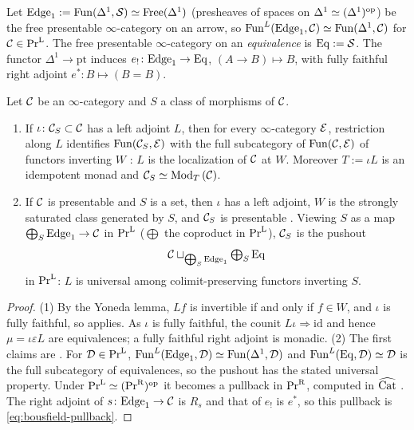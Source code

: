 %
Let
$\mathrm{Edge}_{1} := \operatorname{Fun}(\Delta^{1},\mathcal{S}) \simeq \operatorname{Free}(\Delta^{1})$
(presheaves of spaces on
$\Delta^{1} \simeq (\Delta^{1})^{\mathrm{op}}$)
be the free presentable $\infty$-category on an arrow, so
$\operatorname{Fun}^{L}(\mathrm{Edge}_{1},\mathcal{C}) \simeq \operatorname{Fun}(\Delta^{1},\mathcal{C})$
for $\mathcal{C} \in \operatorname{Pr}^{\operatorname{L}}$. The free presentable $\infty$-category on an
\emph{equivalence} is $\mathrm{Eq} := \mathcal{S}$.
The functor
$\Delta^{1} \to \mathrm{pt}$
induces
$e_{!}\colon \mathrm{Edge}_{1} \to \mathrm{Eq}$,
$(A \to B) \mapsto B$, with fully faithful right adjoint
$e^{*}\colon B \mapsto (B = B)$.

\begin{prop}
\label{prop:bousfield-pushout}
%
Let $\mathcal{C}$ be an $\infty$-category and $S$ a class of morphisms of $\mathcal{C}$.
\begin{enumerate}
\item If
$\iota\colon \mathcal{C}_{S} \subset \mathcal{C}$
has a left adjoint $L$, then for every $\infty$-category $\mathcal{E}$,
restriction along $L$ identifies $\operatorname{Fun}(\mathcal{C}_{S},\mathcal{E})$ with the full subcategory of
$\operatorname{Fun}(\mathcal{C},\mathcal{E})$ of functors inverting $W$ \cite[5.2.7.12]{htt}:
$L$ is the localization of $\mathcal{C}$ at $W$. Moreover $T := \iota L$ is an idempotent
monad and
$\mathcal{C}_{S} \simeq {\operatorname{Mod}_{T}\left(\mathcal{C}\right)}$.
\item If $\mathcal{C}$ is presentable and $S$ is a set, then $\iota$ has a left adjoint,
$W$ is the strongly saturated class generated by $S$,
and $\mathcal{C}_{S}$ is presentable \cite[5.5.4.15]{htt}. Viewing $S$ as a map
$\bigoplus_{S}\mathrm{Edge}_{1} \to \mathcal{C}$
in $\operatorname{Pr}^{\operatorname{L}}$ ($\bigoplus$ the coproduct in $\operatorname{Pr}^{\operatorname{L}}$), $\mathcal{C}_{S}$ is the pushout
\begin{equation*}
\mathcal{C} \sqcup_{\bigoplus_{S}\mathrm{Edge}_{1}} \textstyle\bigoplus_{S}\mathrm{Eq}
\end{equation*}
in $\operatorname{Pr}^{\operatorname{L}}$: $L$ is universal among colimit-preserving functors inverting $S$.
\end{enumerate}
\end{prop}

\begin{proof}
%
(1) By the Yoneda lemma, $Lf$ is invertible if and only if $f \in W$,
and $\iota$ is fully faithful, so \cite[5.2.7.12]{htt} applies.
As $\iota$ is fully faithful, the counit
$L\iota \Rightarrow \mathrm{id}$
and hence
$\mu = \iota\varepsilon L$
are equivalences; a fully faithful right adjoint is monadic.
(2) The first claims are \cite[5.5.4.15]{htt}. For $\mathcal{D} \in \operatorname{Pr}^{\operatorname{L}}$,
$\operatorname{Fun}^{L}(\mathrm{Edge}_{1},\mathcal{D}) \simeq \operatorname{Fun}(\Delta^{1},\mathcal{D})$
and
$\operatorname{Fun}^{L}(\mathrm{Eq},\mathcal{D}) \simeq \mathcal{D}$
is the full subcategory of equivalences,
so the pushout has the stated universal property. Under
$\operatorname{Pr}^{\operatorname{L}} \simeq (\operatorname{Pr}^{\operatorname{R}})^{\mathrm{op}}$
\cite[5.5.3.4]{htt} it becomes a pullback in $\operatorname{Pr}^{\operatorname{R}}$,
computed in $\widehat{\mathrm{Cat}}$ \cite[5.5.3.18]{htt}. The right adjoint of
$s\colon \mathrm{Edge}_{1} \to \mathcal{C}$
is $R_{s}$ and that of $e_{!}$ is $e^{*}$,
so this pullback is \eqref{eq:bousfield-pullback}.
\end{proof}

